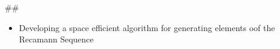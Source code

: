 ## 
\begin{itemize}
    \item Developing a space efficient algorithm for generating elements oof the Recamann Sequence
\end{itemize}